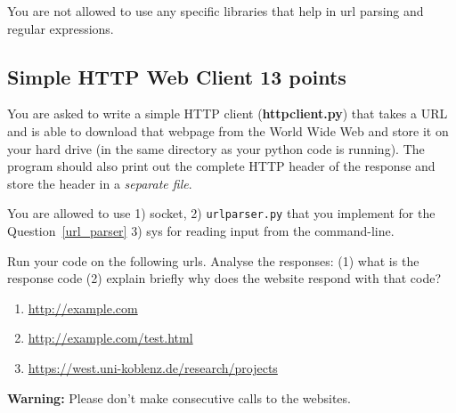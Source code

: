 \documentclass{resources/WeSTassignment}
\begin{document}
\begin{enumerate}
\begin{enumerate}
\end{enumerate}

You are not allowed to use any specific libraries that help in url parsing and regular expressions. 

\subsection{Simple HTTP Web Client \hfill{13 points}}
You are asked to write a simple HTTP client (\textbf{httpclient.py})
that takes a URL and is able to download that webpage from the World Wide Web and store it on your hard drive (in the same
directory as your python code is running). The program should also print out the complete
HTTP header of the response and store the header in a \textit{separate file}.


You are allowed to use 1) socket, 2) \texttt{urlparser.py} that you implement for the Question~\ref{url_parser} 3) sys for reading input from the command-line. 


Run your code on the following urls. Analyse the responses: (1) what is the response code (2) explain briefly why does the website respond with that code? 
\begin{enumerate}
\item 
\url{http://example.com}
\item\url{http://example.com/test.html}
\item 
\url{https://west.uni-koblenz.de/research/projects}
\end{enumerate}

\textbf{Warning:} Please don't make consecutive calls to the websites.
\end{document}
